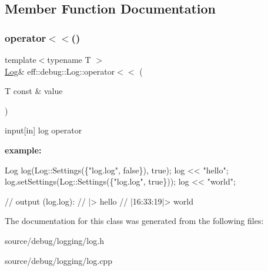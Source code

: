 \subsection{Member Function Documentation}
\mbox{\label{classeff_1_1debug_1_1Log_a5adbb3064e6c035c3fdff199e85c22a2}} 
\subsubsection{\texorpdfstring{operator$<$$<$()}{operator<<()}}
{\footnotesize\ttfamily template$<$typename T $>$ \\
\hyperlink{classeff_1_1debug_1_1Log}{Log}\& eff\+::debug\+::\+Log\+::operator$<$$<$ (\begin{DoxyParamCaption}\item[{T const \&}]{value }\end{DoxyParamCaption})\hspace{0.3cm}{\ttfamily [inline]}}

input\mbox{[}in\mbox{]} log operator

{\bfseries example\+:} 
\begin{DoxyCode}
Log log(Log::Settings(\{\textcolor{stringliteral}{"log.log"}, \textcolor{keyword}{false}\}), \textcolor{keyword}{true});
log << \textcolor{stringliteral}{"hello"};
log.setSettings(Log::Settings(\{\textcolor{stringliteral}{"log.log"}, \textcolor{keyword}{true}\}));
log << \textcolor{stringliteral}{"world"};

\textcolor{comment}{// output (log.log):}
\textcolor{comment}{// |> hello}
\textcolor{comment}{// |16:33:19|> world}
\end{DoxyCode}
 

The documentation for this class was generated from the following files\+:\begin{DoxyCompactItemize}
\item 
source/debug/logging/log.\+h\item 
source/debug/logging/log.\+cpp\end{DoxyCompactItemize}
